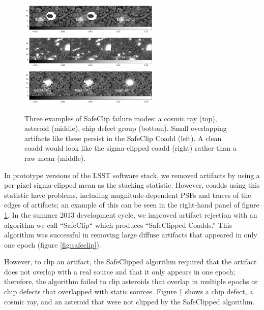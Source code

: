 \documentclass[DM,authoryear,toc]{lsstdoc}
\begin{document}
\begin{figure}
\begin{centering}
\includegraphics[width=0.6\textwidth]{figures/safeClip1.png}
\includegraphics[width=0.6\textwidth]{figures/safeClip2.png}
\includegraphics[width=0.6\textwidth]{figures/safeClip3.png}
\par\end{centering}
\caption{Three examples of SafeClip failure modes: a cosmic ray (top), asteroid (middle), chip defect group (bottom). Small overlapping artifacts like these persist in the SafeClip Coadd (left).  A clean coadd would look like the sigma-clipped coadd (right) rather than a raw mean (middle). \label{fig:safeClipExamples}}
\end{figure}

In prototype versions of the LSST software stack, we removed artifacts by using a per-pixel sigma-clipped mean as the stacking statistic.
However, coadds using this statistic have problems, including magnitude-dependent PSFs and traces of the edges of artifacts; an example of this can be seen in the right-hand panel of figure \ref{fig:safeClipExamples}.
In the summer 2013 development cycle, we improved artifact rejection with an algorithm we call ``SafeClip`` which produces ``SafeClipped Coadds.''
This algorithm was successful in removing large diffuse artifacts that appeared in only one epoch (figure \ref{fig:safeclip}).


However, to clip an artifact, the SafeClipped algorithm required that the artifact does not overlap with a real source and that it only appears in one epoch; therefore, the algorithm failed to clip asteroids that overlap in multiple epochs or chip defects that overlapped with static sources.
Figure  \ref{fig:safeClipExamples} shows a chip defect, a cosmic ray, and an asteroid that were not clipped by the SafeClipped algorithm.
\end{document}
